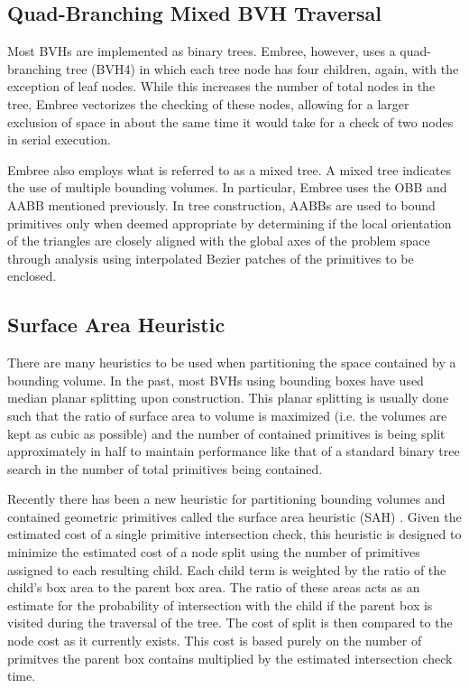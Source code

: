 \documentclass{anstrans}
\begin{document}
\subsection{Quad-Branching Mixed BVH Traversal}

Most BVHs are implemented as binary trees. Embree, however, uses a quad-branching tree (BVH4) in which each tree node has four children, again, with the exception of leaf nodes. While this increases the number of total nodes in the tree, Embree vectorizes the checking of these nodes, allowing for a larger exclusion of space in about the same time it would take for a check of two nodes in serial execution. 

Embree also employs what is referred to as a mixed tree. A mixed tree indicates the use of multiple bounding volumes. In particular, Embree uses the OBB and AABB mentioned previously. In tree construction, AABBs are used to bound primitives only when deemed appropriate by determining if the local orientation of the triangles are closely aligned with the global axes of the problem space through analysis using interpolated Bezier patches of the primitives to be enclosed.

\subsection{Surface Area Heuristic}

There are many heuristics to be used when partitioning the space contained by a bounding volume. In the past, most BVHs using bounding boxes have used median planar splitting upon construction. This planar splitting is usually done such that the ratio of surface area to volume is maximized (i.e. the volumes are kept as cubic as possible) and the number of contained primitives is being split approximately in half to maintain performance like that of a standard binary tree search in the number of total primitives being contained. 

Recently there has been a new heuristic for partitioning bounding volumes and contained geometric primitives called the surface area heuristic (SAH) \cite{sah}. Given the estimated cost of a single primitive intersection check, this heuristic is designed to minimize the estimated cost of a node split using the number of primitives assigned to each resulting child. Each child term is weighted by the ratio of the child's box area to the parent box area. The ratio of these areas acts as an estimate for the probability of intersection with the child if the parent box is visited during the traversal of the tree. The cost of split is then compared to the node cost as it currently exists. This cost is based purely on the number of primitves the parent box contains multiplied by the estimated intersection check time.
\end{document}
